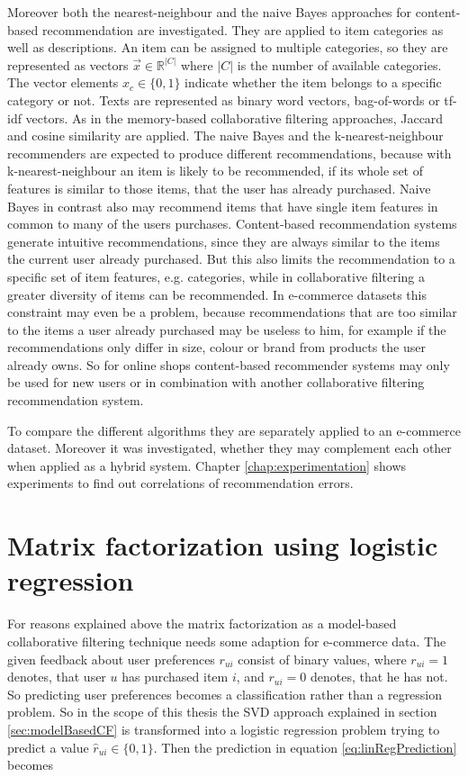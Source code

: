 \documentclass[10pt]{reportMaster}
\begin{document}
Moreover both the nearest-neighbour and the naive Bayes approaches for content-based recommendation are investigated.
They are applied to item categories as well as descriptions.
An item can be assigned to multiple categories, so they are represented as vectors $\vec{x} \in \mathds{R}^{|C|}$ where $|C|$ is the number of available categories.
The vector elements $x_c \in \{0,1\}$ indicate whether the item belongs to a specific category or not. 
Texts are represented as binary word vectors, bag-of-words or tf-idf vectors.
As in the memory-based collaborative filtering approaches, Jaccard and cosine similarity are applied.
The naive Bayes and the k-nearest-neighbour recommenders are expected to produce different recommendations, because with k-nearest-neighbour an item is likely to be recommended, if its whole set of features is similar to those items, that the user has already purchased.
Naive Bayes in contrast also may recommend items that have single item features in common to many of the users purchases.
Content-based recommendation systems generate intuitive recommendations, since they are always similar to the items the current user already purchased.
But this also limits the recommendation to a specific set of item features, e.g. categories, while in collaborative filtering a greater diversity of items can be recommended.
In e-commerce datasets this constraint may even be a problem, because recommendations that are too similar to the items a user already purchased may be useless to him, for example if the recommendations only differ in size, colour or brand from products the user already owns.
So for online shops content-based recommender systems may only be used for new users or in combination with another collaborative filtering recommendation system. %

To compare the different algorithms they are separately applied to an e-commerce dataset.
Moreover it was investigated, whether they may complement each other when applied as a hybrid system.
Chapter \ref{chap:experimentation} shows experiments to find out correlations of recommendation errors.


\section{Matrix factorization using logistic regression}
\label{sec:logRegSVD}

For reasons explained above the matrix factorization as a model-based collaborative filtering technique needs some adaption for e-commerce data.
The given feedback about user preferences $r_{ui}$ consist of binary values, where $r_{ui} = 1$ denotes, that user $u$ has purchased item $i$, and $r_{ui} = 0$ denotes, that he has not.
So predicting user preferences becomes a classification rather than a regression problem.
So in the scope of this thesis the SVD approach explained in section \ref{sec:modelBasedCF} is transformed into a logistic regression problem trying to predict a value $\hat{r}_{ui} \in \{0,1\}$.
Then the prediction in equation \ref{eq:linRegPrediction} becomes 
\end{document}
